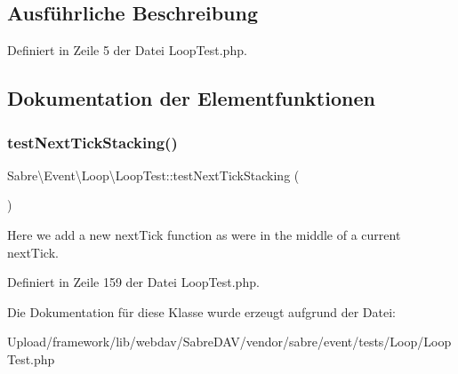 \subsection{Ausführliche Beschreibung}


Definiert in Zeile 5 der Datei Loop\+Test.\+php.



\subsection{Dokumentation der Elementfunktionen}
\mbox{\label{class_sabre_1_1_event_1_1_loop_1_1_loop_test_af7450ad410a04f1f3f9211a5666447b1}} 
\subsubsection{\texorpdfstring{test\+Next\+Tick\+Stacking()}{testNextTickStacking()}}
{\footnotesize\ttfamily Sabre\textbackslash{}\+Event\textbackslash{}\+Loop\textbackslash{}\+Loop\+Test\+::test\+Next\+Tick\+Stacking (\begin{DoxyParamCaption}{ }\end{DoxyParamCaption})}

Here we add a new next\+Tick function as we\textquotesingle{}re in the middle of a current next\+Tick. 

Definiert in Zeile 159 der Datei Loop\+Test.\+php.



Die Dokumentation für diese Klasse wurde erzeugt aufgrund der Datei\+:\begin{DoxyCompactItemize}
\item 
Upload/framework/lib/webdav/\+Sabre\+D\+A\+V/vendor/sabre/event/tests/\+Loop/Loop\+Test.\+php\end{DoxyCompactItemize}
